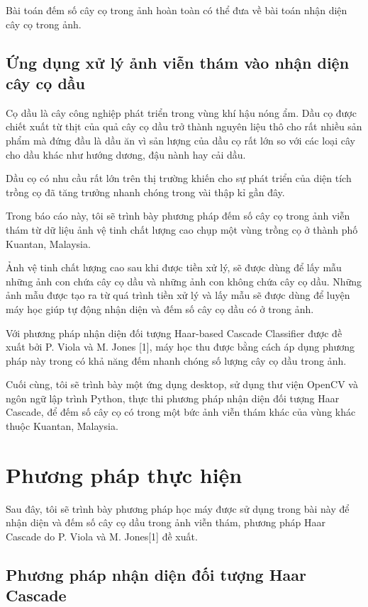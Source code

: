 \documentclass[14pt, oneside, a4paper, openany]{scrartcl}
\begin{document}
Bài toán đếm số cây cọ trong ảnh hoàn toàn có thể đưa về bài toán nhận diện cây cọ trong ảnh.

\subsection{Ứng dụng xử lý ảnh viễn thám vào nhận diện cây cọ dầu}
Cọ dầu là cây công nghiệp phát triển trong vùng khí hậu nóng ẩm. Dầu cọ được chiết xuất từ thịt của quả cây cọ dầu trở thành nguyên liệu thô cho rất nhiều sản phẩm mà đứng đầu là dầu ăn vì sản lượng của dầu cọ rất lớn so với các loại cây cho dầu khác như hướng dương, đậu nành hay cải dầu. 

Dầu cọ có nhu cầu rất lớn trên thị trường khiến cho sự phát triển của diện tích trồng cọ đã tăng trưởng nhanh chóng trong vài thập kỉ gần đây.

Trong báo cáo này, tôi sẽ trình bày phương pháp đếm số cây cọ trong ảnh viễn thám từ dữ liệu ảnh vệ tinh chất lượng cao chụp một vùng trồng cọ ở thành phố Kuantan, Malaysia. 

Ảnh vệ tinh chất lượng cao sau khi được tiền xử lý, sẽ được dùng để lấy mẫu những ảnh con chứa cây cọ dầu và những ảnh con không chứa cây cọ dầu. Những ảnh mẫu được tạo ra từ quá trình tiền xử lý và lấy mẫu sẽ được dùng để luyện máy học giúp tự động nhận diện và đếm số cây cọ dầu có ở trong ảnh.

Với phương pháp nhận diện đối tượng Haar-based Cascade Classifier được đề xuất bởi P. Viola và M. Jones [1], máy học thu được bằng cách áp dụng phương pháp này trong có khả năng đếm nhanh chóng số lượng cây cọ dầu trong ảnh.

Cuối cùng, tôi sẽ trình bày một ứng dụng desktop, sử dụng thư viện OpenCV và ngôn ngữ lập trình Python, thực thi phương pháp nhận diện đối tượng Haar Cascade, để đếm số cây cọ có trong một bức ảnh viễn thám khác của vùng khác thuộc Kuantan, Malaysia.

\newpage
\section{Phương pháp thực hiện}
Sau đây, tôi sẽ trình bày phương pháp học máy được sử dụng trong bài này để nhận diện và đếm số cây cọ dầu trong ảnh viễn thám, phương pháp Haar Cascade do  P. Viola và M. Jones[1] đề xuất.
\subsection{Phương pháp nhận diện đối tượng Haar Cascade}
\end{document}
